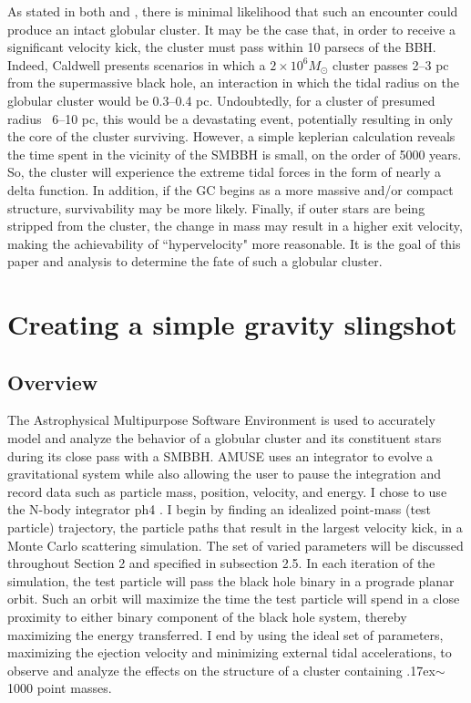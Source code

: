 \documentclass{aastex62}
\begin{document}
As stated in both \citet{cald14} and \citet{sam15}, there is minimal likelihood that such an encounter could produce an intact globular cluster. It may be the case that, in order to receive a significant velocity kick, the cluster must pass within 10 parsecs of the BBH. Indeed, Caldwell presents scenarios in which a $2\times10^6M_{\odot}$ cluster passes 2--3 pc from the supermassive black hole, an interaction in which the tidal radius on the globular cluster would be 0.3--0.4 pc. Undoubtedly, for a cluster of presumed radius ~6--10 pc, this would be a devastating event, potentially resulting in only the core of the cluster surviving. However, a simple keplerian calculation reveals the time spent in the vicinity of the SMBBH is small, on the order of 5000 years. So, the cluster will experience the extreme tidal forces in the form of nearly a delta function. In addition, if the GC begins as a more massive and/or compact structure, survivability may be more likely. Finally, if outer stars are being stripped from the cluster, the change in mass may result in a higher exit velocity, making the achievability of ``hypervelocity" more reasonable. It is the goal of this paper and analysis to determine the fate of such a globular cluster. 

\section{Creating a simple gravity slingshot}
\subsection{Overview}
The Astrophysical Multipurpose Software Environment \citep{zwart18} is used to accurately model and analyze the behavior of a globular cluster and its constituent stars during its close pass with a SMBBH. AMUSE uses an integrator to evolve a gravitational system while also allowing the user to pause the integration and record data such as particle mass, position, velocity, and energy. I chose to use the N-body integrator ph4 \citep{McM12}. I begin by finding an idealized point-mass (test particle) trajectory, the particle paths that result in the largest velocity kick, in a Monte Carlo scattering simulation. The set of varied parameters will be discussed throughout Section 2 and specified in subsection 2.5. In each iteration of the simulation, the test particle will pass the black hole binary in a prograde planar orbit. Such an orbit will maximize the time the test particle will spend in a close proximity to either binary component of the black hole system, thereby maximizing the energy transferred. I end by using the ideal set of parameters, maximizing the ejection velocity and minimizing external tidal accelerations, to observe and analyze the effects on the structure of a cluster containing {\raise.17ex\hbox{$\scriptstyle\mathtt{\sim}$}}1000 point masses. 
\end{document}
